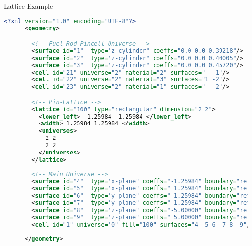
\begin{frame}[fragile]{Lattice Example}


  \begin{scriptsize}
    \begin{lstlisting}[language=XML,gobble=4]
      <?xml version="1.0" encoding="UTF-8"?>
      <geometry>

        <!-- Fuel Rod Pincell Universe -->
        <surface id="1"  type="z-cylinder" coeffs="0.0 0.0 0.39218"/>     <!-- fuel OR   -->
        <surface id="2"  type="z-cylinder" coeffs="0.0 0.0 0.40005"/>     <!-- gap OR    -->
        <surface id="3"  type="z-cylinder" coeffs="0.0 0.0 0.45720"/>     <!-- clad OR   -->
        <cell id="21" universe="2" material="2" surfaces="  -1"/>         <!-- fuel  -->
        <cell id="22" universe="2" material="3" surfaces="1 -2"/>         <!-- clad  -->
        <cell id="23" universe="2" material="1" surfaces="   2"/>         <!-- water -->

        <!-- Pin-Lattice -->
        <lattice id="100" type="rectangular" dimension="2 2">
          <lower_left> -1.25984 -1.25984 </lower_left>
          <width> 1.25984 1.25984 </width>
          <universes>
            2 2
            2 2
          </universes>
        </lattice>
        
        <!-- Main Universe -->
        <surface id="4"  type="x-plane" coeffs="-1.25984" boundary="reflective"/>
        <surface id="5"  type="x-plane" coeffs=" 1.25984" boundary="reflective"/>
        <surface id="6"  type="y-plane" coeffs="-1.25984" boundary="reflective"/>
        <surface id="7"  type="y-plane" coeffs=" 1.25984" boundary="reflective"/>
        <surface id="8"  type="z-plane" coeffs="-5.00000" boundary="reflective"/>
        <surface id="9"  type="z-plane" coeffs=" 5.00000" boundary="reflective"/>
        <cell id="1" universe="0" fill="100" surfaces="4 -5 6 -7 8 -9"/>
        
      </geometry>
    \end{lstlisting}
  \end{scriptsize}


\end{frame}
